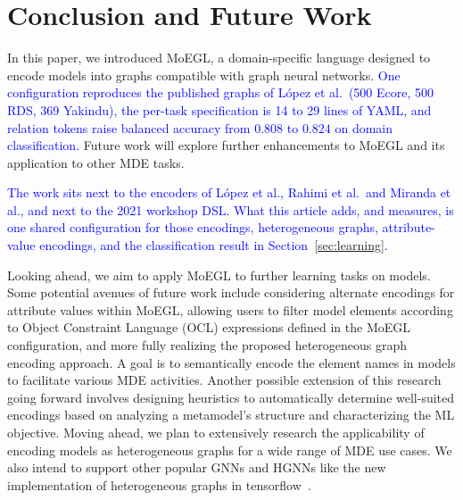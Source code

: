 \documentclass[journal,article,submit,moreauthors,technologies]{Definitions/mdpi}
\newcommand{\rev}[1]{\textcolor{blue}{#1}}
\begin{document}
\section{Conclusion and Future Work} \label{Sec:conclusion}

In this paper, we introduced MoEGL, a domain-specific language designed to encode models into graphs compatible with graph neural networks. \rev{One configuration reproduces the published graphs of L\'opez et al.\ (500 Ecore, 500 RDS, 369 Yakindu), the per-task specification is 14 to 29 lines of YAML, and relation tokens raise balanced accuracy from $0.808$ to $0.824$ on domain classification.} Future work will explore further enhancements to MoEGL and its application to other MDE tasks.

\rev{The work sits next to the encoders of L\'opez et al., Rahimi et al.\ and Miranda et al., and next to the 2021 workshop DSL. What this article adds, and measures, is one shared configuration for those encodings, heterogeneous graphs, attribute-value encodings, and the classification result in Section~\ref{sec:learning}.}

Looking ahead, we aim to apply MoEGL to further learning tasks on models. Some potential avenues of future work include considering alternate encodings for attribute values within MoEGL, allowing users to filter model elements according to Object Constraint Language (OCL) expressions defined in the MoEGL configuration, and more fully realizing the proposed heterogeneous graph encoding approach. A goal is to semantically encode the element names in models to facilitate various MDE activities. Another possible extension of this research going forward involves designing heuristics to automatically determine well-suited encodings based on analyzing a metamodel's structure and characterizing the ML objective. Moving ahead, we plan to extensively research the applicability of encoding models as heterogeneous graphs for a wide range of MDE use cases. We also intend to support other popular GNNs and HGNNs like the new implementation of heterogeneous graphs in tensorflow~\cite{HPyG_Tensorflow}.

\vspace{6pt}


\end{document}
